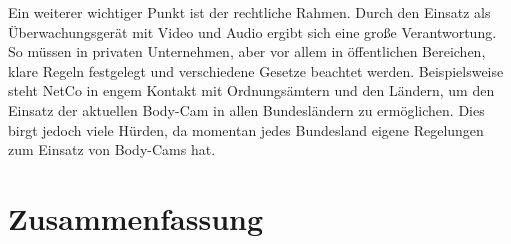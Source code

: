 \documentclass[thesis.tex]{subfiles}
\begin{document}
Ein weiterer wichtiger Punkt ist der rechtliche Rahmen.
Durch den Einsatz als Überwachungsgerät mit Video und Audio ergibt sich eine große Verantwortung.
So müssen in privaten Unternehmen, aber vor allem in öffentlichen Bereichen, klare Regeln festgelegt und verschiedene Gesetze beachtet werden.
Beispielsweise steht NetCo in engem Kontakt mit Ordnungsämtern und den Ländern, um den Einsatz der aktuellen Body-Cam in allen Bundesländern zu ermöglichen.
Dies birgt jedoch viele Hürden, da momentan jedes Bundesland eigene Regelungen zum Einsatz von Body-Cams hat.

\section{Zusammenfassung}

\subfilebib %
\end{document}
